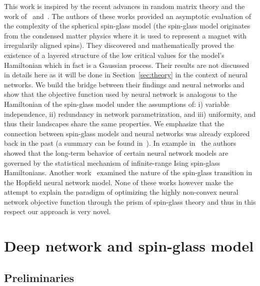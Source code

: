 \documentclass[twoside]{article}
\begin{document}
This work is inspired by the recent advances in random matrix theory and the work of~\cite{AAC2010} and~\cite{AAC2013}. The authors of these works provided an asymptotic evaluation of the complexity of the spherical spin-glass model (the spin-glass model originates from the condensed matter physics where it is used to represent a magnet with irregularily aligned spins). They discovered and mathematically proved the existence of a layered structure of the low critical values for the model's Hamiltonian which in fact is a Gaussian process. Their results are not discussed in details here as it will be done in Section~\ref{sec:theory} in the context of neural networks. We build the bridge between their findings and neural networks and show that the objective function used by neural network is analogous to the Hamiltonian of the spin-glass model under the assumptions of: i) variable independence, ii) redundancy in network parametrization, and iii) uniformity, and thus their landscapes share the same properties. We emphasize that the connection between spin-glass models and neural networks was already explored back in the past (a summary can be found in~\cite{Dotsenko1995}). In example in~\cite{PhysRevA.32.1007} the authors showed that the long-term behavior of certain neural network models are governed by the statistical mechanism of infinite-range Ising spin-glass Hamiltonians. Another work~\cite{0305-4470-30-23-009} examined the nature of the spin-glass transition in the Hopfield neural network model. None of these works however make the attempt to explain the paradigm of optimizing the highly non-convex neural network objective function through the prism of spin-glass theory and thus in this respect our approach is very novel.

\section{Deep network and spin-glass model}
\label{sec:NNSG}

\subsection{Preliminaries}
\end{document}
